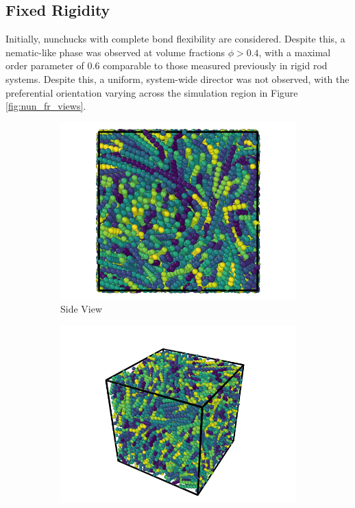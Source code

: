 \documentclass[11pt, a4paper]{article} %
\begin{document}
\subsection{Fixed Rigidity}

Initially, nunchucks with complete bond flexibility are considered. Despite this, a nematic-like phase was observed at volume fractions $\phi > 0.4$, with a maximal order parameter of \num{0.6} comparable to those measured previously in rigid rod systems. Despite this, a uniform, system-wide director was not observed, with the preferential orientation varying across the simulation region in Figure \ref{fig:nun_fr_views}.


\begin{figure}
	\centering
	\begin{subfigure}{.5\textwidth}
		\centering
		\includegraphics[width=.9\linewidth]{Figures/nun_fr_side}
		\caption{Side View}
		\label{fig:nun_fr_side}
	\end{subfigure}%
	\begin{subfigure}{.5\textwidth}
		\centering
		\includegraphics[width=.9\linewidth]{Figures/nun_fr_perspective}

\end{subfigure}
\end{figure}
\end{document}
